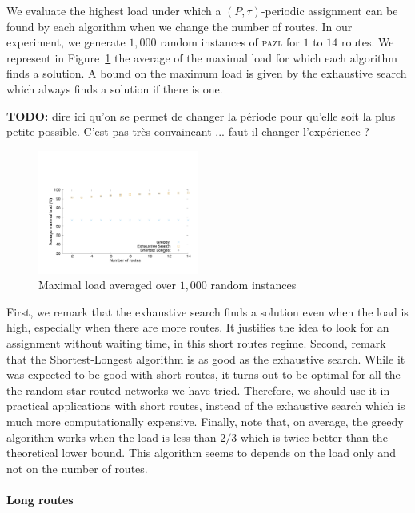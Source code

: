 \documentclass[10pt, conference, letterpaper]{IEEEtran}
\newcommand\pazl{\textsc{pazl}\xspace}
\begin{document}
      We evaluate the highest load under which a $(P,\tau)$-periodic assignment can be found by each algorithm when we change the number of routes. In our experiment, we generate $1,000$ random instances of \pazl for $1$ to $14$ routes. We represent in Figure~\ref{fig:short} the average of the maximal load for which each algorithm finds a solution. A bound on the maximum load is given by the exhaustive search which always finds a solution if there is one. 
      
      \textbf{TODO:} dire ici qu'on se permet de changer la période pour qu'elle soit la plus petite possible. C'est pas très convaincant ... faut-il changer l'expérience ?  
        
      \begin{figure}[h]
      \begin{center}
	 \includegraphics[width=0.47\textwidth]{periode_petite.pdf}
      \end{center}
      \caption{Maximal load averaged over $1,000$ random instances}\label{fig:short}
      \end{figure}
      First, we remark that the exhaustive search finds a solution even when the load is high, especially when there are more routes.
      It justifies the idea to look for an assignment without waiting time, in this short routes regime.
      Second, remark that the Shortest-Longest algorithm is as good as the exhaustive search. While it was expected to be good with short routes, it turns out to be optimal for all the the random star routed networks we have tried. Therefore, we should use it in practical applications with short routes, instead of the exhaustive search which is much more computationally expensive. 
      Finally, note that, on average, the greedy algorithm works when the load is less than $2/3$ which is twice better than the theoretical lower bound. This algorithm seems to depends on the load only and not on the number of routes.
      
        \paragraph{Long routes}
      
\end{document}
